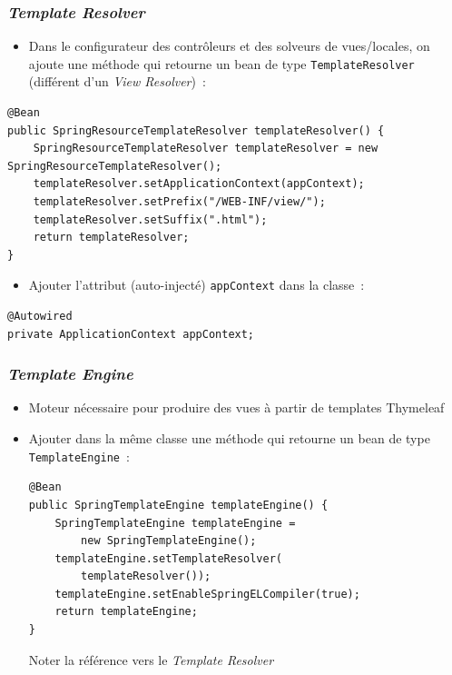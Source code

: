 \documentclass{beamer}
\begin{document}
\begin{frame}[fragile]
	\frametitle{\textit{Template Resolver}}
	\begin{itemize}
		\item Dans le configurateur des contrôleurs et des solveurs de vues/locales, on ajoute une méthode qui retourne un bean de type \texttt{TemplateResolver} (différent d'un \textit{View Resolver})~:
	\end{itemize}

\begin{lstlisting}
@Bean
public SpringResourceTemplateResolver templateResolver() {
	SpringResourceTemplateResolver templateResolver = new SpringResourceTemplateResolver();
	templateResolver.setApplicationContext(appContext);
	templateResolver.setPrefix("/WEB-INF/view/");
	templateResolver.setSuffix(".html");
	return templateResolver;
}
\end{lstlisting}
\begin{itemize}
\item Ajouter l'attribut (auto-injecté) \texttt{appContext} dans la classe~:
\end{itemize}
\begin{lstlisting}
@Autowired
private ApplicationContext appContext;
\end{lstlisting}
	
\end{frame} 

\begin{frame}[fragile]
	\frametitle{\textit{Template Engine}}
	\begin{itemize}
		\item Moteur nécessaire pour produire des vues à partir de templates Thymeleaf
		\item Ajouter dans la même classe une méthode qui retourne un bean de type \texttt{TemplateEngine}~:
\begin{lstlisting}
@Bean
public SpringTemplateEngine templateEngine() {
	SpringTemplateEngine templateEngine = 
		new SpringTemplateEngine();
	templateEngine.setTemplateResolver(
		templateResolver());
	templateEngine.setEnableSpringELCompiler(true);
	return templateEngine;
}
\end{lstlisting}
Noter la référence vers le \textit{Template Resolver}
	\end{itemize}
\end{frame} 
\end{document}
